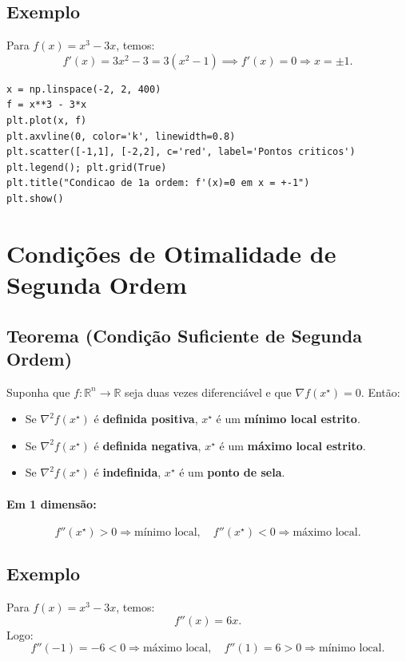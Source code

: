 \documentclass[9pt,a4paper]{extarticle}
\begin{document}
\subsection*{Exemplo}
Para $f(x) = x^3 - 3x$, temos:
\[
f'(x) = 3x^2 - 3 = 3(x^2 - 1) \implies f'(x)=0 \Rightarrow x = \pm 1.
\]

\begin{lstlisting}
x = np.linspace(-2, 2, 400)
f = x**3 - 3*x
plt.plot(x, f)
plt.axvline(0, color='k', linewidth=0.8)
plt.scatter([-1,1], [-2,2], c='red', label='Pontos criticos')
plt.legend(); plt.grid(True)
plt.title("Condicao de 1a ordem: f'(x)=0 em x = +-1")
plt.show()
\end{lstlisting}

\section{Condições de Otimalidade de Segunda Ordem}

\subsection*{Teorema (Condição Suficiente de Segunda Ordem)}
Suponha que $f:\mathbb{R}^n \to \mathbb{R}$ seja duas vezes diferenciável e que $\nabla f(x^\star) = 0$. Então:
\begin{itemize}
    \item Se $\nabla^2 f(x^\star)$ é \textbf{definida positiva}, $x^\star$ é um \textbf{mínimo local estrito}.
    \item Se $\nabla^2 f(x^\star)$ é \textbf{definida negativa}, $x^\star$ é um \textbf{máximo local estrito}.
    \item Se $\nabla^2 f(x^\star)$ é \textbf{indefinida}, $x^\star$ é um \textbf{ponto de sela}.
\end{itemize}

\paragraph{Em 1 dimensão:}
\[
f''(x^\star) > 0 \Rightarrow \text{mínimo local}, \quad
f''(x^\star) < 0 \Rightarrow \text{máximo local}.
\]

\subsection*{Exemplo}
Para $f(x) = x^3 - 3x$, temos:
\[
f''(x) = 6x.
\]
Logo:
\[
f''(-1) = -6 < 0 \Rightarrow \text{máximo local}, \quad
f''(1) = 6 > 0 \Rightarrow \text{mínimo local}.
\]
\end{document}
